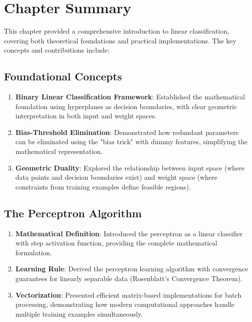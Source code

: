 \section{Chapter Summary}

This chapter provided a comprehensive introduction to linear classification, covering both theoretical foundations and practical implementations. The key concepts and contributions include:

\subsection{Foundational Concepts}
\begin{enumerate}
    \item \textbf{Binary Linear Classification Framework}: Established the mathematical foundation using hyperplanes as decision boundaries, with clear geometric interpretation in both input and weight spaces.
    
    \item \textbf{Bias-Threshold Elimination}: Demonstrated how redundant parameters can be eliminated using the "bias trick" with dummy features, simplifying the mathematical representation.
    
    \item \textbf{Geometric Duality}: Explored the relationship between input space (where data points and decision boundaries exist) and weight space (where constraints from training examples define feasible regions).
\end{enumerate}

\subsection{The Perceptron Algorithm}
\begin{enumerate}
    \item \textbf{Mathematical Definition}: Introduced the perceptron as a linear classifier with step activation function, providing the complete mathematical formulation.
    
    \item \textbf{Learning Rule}: Derived the perceptron learning algorithm with convergence guarantees for linearly separable data (Rosenblatt's Convergence Theorem).
    
    \item \textbf{Vectorization}: Presented efficient matrix-based implementations for batch processing, demonstrating how modern computational approaches handle multiple training examples simultaneously.
\end{enumerate}

